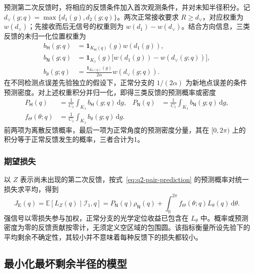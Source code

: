预测第二次反馈时，将相应的反馈条件加入首次观测条件，并对未知半径积分。记 \(d_\vee(g;q)=\max\{d_1(g),d_2(g;q)\}\)。两次正常接收要求 \(R\ge d_\vee\)，对应权重为 \(w(d_\vee)\)；先接收而后无信号的权重则为 \(w(d_1)-w(d_\vee)\)。结合方向信息，三类反馈的未归一化位置权重为
\begin{equation}
\begin{aligned}
 b_{\mathsf H}(g;q)&=\mathbf1_{K_{\mathsf H}(q)}(g)w(d_1(g)),\\
 b_{\mathsf N}(g;q)&=\mathbf1_{K_1}(g)\bigl[w(d_1(g))-w(d_\vee(g;q))\bigr],\\
 b_\theta(g;q)&=\frac{\mathbf1_{K_\theta(q)}(g)}{2\alpha}w(d_\vee(g;q)).
\end{aligned}
\label{eq:q2-pair-feedback-weights}
\end{equation}
在不同检测点误差先验独立的假设下，正常分支的 \(1/(2\alpha)\) 为新地点误差的条件预测密度。对上述权重积分并归一化，即得三类反馈的预测概率或密度
\begin{equation}
\begin{aligned}
 P_{\mathsf H}(q)&=\frac{1}{C_1}\int_{K_1}b_{\mathsf H}(g;q)\,\mathrm dg,
 &P_{\mathsf N}(q)&=\frac{1}{C_1}\int_{K_1}b_{\mathsf N}(g;q)\,\mathrm dg,\\
 f_\Theta(\theta;q)&=\frac{1}{C_1}\int_{K_1}b_\theta(g;q)\,\mathrm dg.
\end{aligned}
\label{eq:q2-pair-prediction}
\end{equation}
前两项为离散反馈概率，最后一项为正常角度的预测密度分量，其在 \([0,2\pi)\) 上的积分等于正常反馈发生的概率，三者合计为1。

\subsubsection{期望损失}

以 \(Z\) 表示尚未出现的第二次反馈，按式~\eqref{eq:q2-pair-prediction} 的预测概率对统一损失求平均，得到
\begin{equation}
 J_{\mathrm E}(q)=\mathbb E[L_Z(q)\mid\mathcal I_1,q]
 =P_{\mathsf N}(q)\rho_{\mathsf N}(q)
 +\int_0^{2\pi}f_\Theta(\theta;q)L_\theta(q)\,\mathrm d\theta.
\label{eq:q2-pair-expected-objective}
\end{equation}
强信号以零损失参与加权，正常分支的光学定位收益已包含在 \(L_\theta\) 中。概率或预测密度为零的反馈贡献按零计，无须定义空区域的包围圆。该指标衡量所设先验下的平均剩余不确定性，其较小并不意味着每种反馈下的损失都较小。

\subsection{最小化最坏剩余半径的模型}


